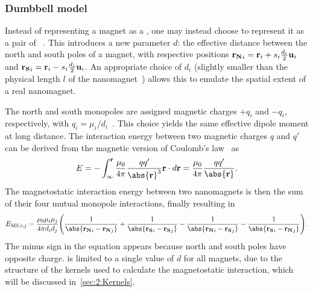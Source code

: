 \subsubsection{Dumbbell model}\label{sec:2:Dumbbell}
Instead of representing a magnet as a , one may instead choose to represent it as a pair of ~\cite{MagneticMonopoles2008,MagneticMonopoleDynamics}.
This introduces a new parameter $d$: the effective distance between the north and south poles of a magnet, with respective positions $\boldsymbol{\mathbf{r_N}}_i = \boldsymbol{\mathbf{r}}_i + s_i\frac{d_i}{2}\boldsymbol{\mathbf{u}}_i$ and $\boldsymbol{\mathbf{r_S}}_i = \boldsymbol{\mathbf{r}}_i - s_i\frac{d_i}{2}\boldsymbol{\mathbf{u}}_i$.
An appropriate choice of $d_i$ (slightly smaller than the physical length $l$ of the nanomagnet~\cite{DDG_Masterproef}) allows this  to emulate the spatial extent of a real nanomagnet. \par
The north and south monopoles are assigned magnetic charges $+q_i$ and $-q_i$, respectively, with $q_i=\mu_i/d_i$~\cite{MagneticMonopoles2008}.
This choice yields the same effective dipole moment at long distance.
The interaction energy between two magnetic charges $q$ and $q'$ can be derived from the magnetic version of Coulomb's law~\cite{ForceMagneticDipole} as
\begin{equation}
	E = -\int_\infty^{\vc{r}} \frac{\mu_0}{\num{4}\pi}\frac{qq'}{\abs{\vc{r}}^3} \vc{r} \cdot d\vc{r} = \frac{\mu_0}{\num{4}\pi} \frac{qq'}{\abs{\vc{r}}} \mathrm{.}
\end{equation}
The magnetostatic interaction energy between two nanomagnets is then the sum of their four mutual monopole interactions, finally resulting in
\begin{equation}
	E_{\mathrm{MS},i,j} = \frac{\mu_0 \mu_i \mu_j}{4\pi d_i d_j} \Bigg(\frac{1}{\abs{\mathbf{r_N}_i - \mathbf{r_N}_j}} + \frac{1}{\abs{\mathbf{r_S}_i - \mathbf{r_S}_j}}\\ - \frac{1}{\abs{\mathbf{r_N}_i - \mathbf{r_S}_j}} - \frac{1}{\abs{\mathbf{r_S}_i - \mathbf{r_N}_j}}\Bigg) \mathrm{.} \label{eq:2:E_MS_mono}
\end{equation}
The minus sign in the equation appears because north and south poles have opposite charge.
\hotspice is limited to a single value of $d$ for all magnets, due to the structure of the kernels used to calculate the magnetostatic interaction, which will be discussed in~\cref{sec:2:Kernels}.

